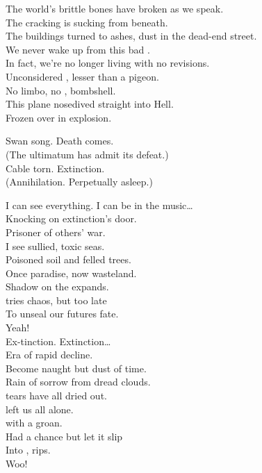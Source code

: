 The world's brittle bones have broken as we speak. \\
The cracking  is sucking from beneath. \\
The buildings turned to ashes, dust in the dead-end street. \\
We never wake up from this bad . \\

In fact, we're no longer living with no revisions. \\
Unconsidered , lesser than a pigeon. \\
No limbo, no , bombshell. \\
This plane nosedived straight into Hell. \\
Frozen over in explosion. \\


Swan song. Death comes. \\
(The ultimatum has admit its defeat.) \\
Cable torn. Extinction. \\
(Annihilation. Perpetually asleep.) \\




I can see everything. I can be in the music… \\

Knocking on extinction's door. \\
Prisoner of others' war. \\
I see sullied, toxic seas. \\
Poisoned soil and felled trees. \\
Once paradise, now wasteland. \\
Shadow on the  expands. \\
 tries chaos, but too late \\
To unseal our futures fate. \\
Yeah! \\

Ex-tinction. Extinction… \\

Era of rapid decline. \\
Become naught but dust of time. \\
Rain of sorrow from dread clouds. \\
 tears have all dried out. \\
 left us all alone. \\
 with a groan. \\
Had a chance but let it slip \\
Into ,  rips. \\
Woo! \\

